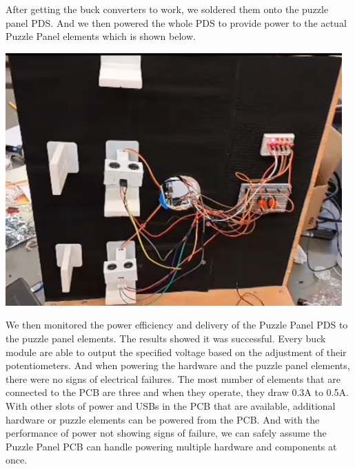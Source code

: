 \documentclass[a4paper, 10pt]{article}
\begin{document}
After getting the buck converters to work, we soldered them onto the puzzle panel PDS. And we then powered the whole PDS to provide power to the actual Puzzle Panel elements which is shown below. 

\includegraphics[scale=0.85]{Puzzle Panel Powered}

We then monitored the power efficiency and delivery of the Puzzle Panel PDS to the puzzle panel elements. The results showed it was successful. Every buck module are able to output the specified voltage based on the adjustment of their potentiometers. And when powering the hardware and the puzzle panel elements, there were no signs of electrical failures. The most number of elements that are connected to the PCB are three and when they operate, they draw 0.3A to 0.5A. With other slots of power and USBs in the PCB that are available, additional hardware or puzzle elements can be powered from the PCB. And with the performance of power not showing signs of failure, we can safely assume the Puzzle Panel PCB can handle powering multiple hardware and components at once.
\end{document}
